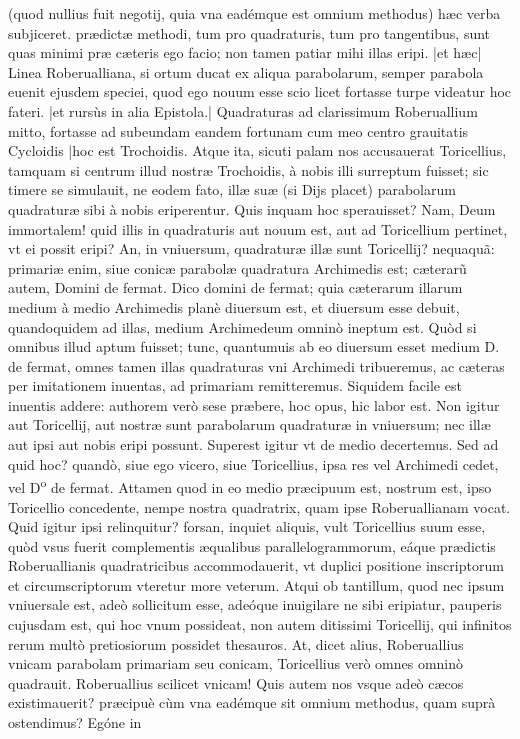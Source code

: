 \documentclass[11pt,a4paper]{article}
\begin{document}
(quod nullius fuit negotij, quia vna eadémque est omnium methodus) hæc verba subjiceret. prædictæ methodi, tum pro quadraturis, tum pro tangentibus, sunt quas minimi præ cæteris ego facio; non tamen patiar mihi illas eripi. |et hæc| Linea Roberualliana, si ortum ducat ex aliqua parabolarum, semper parabola euenit ejusdem speciei, quod ego nouum esse scio licet fortasse turpe videatur hoc fateri. |et rursùs in alia Epistola.| Quadraturas ad clarissimum Roberuallium mitto, fortasse ad subeundam eandem fortunam cum meo centro grauitatis Cycloidis |hoc est Trochoidis. Atque ita, sicuti palam nos accusauerat Toricellius, tamquam si centrum illud nostræ Trochoidis, à nobis illi surreptum fuisset; sic timere se simulauit, ne eodem fato, illæ suæ (si Dijs placet) parabolarum quadraturæ sibi à nobis eriperentur. Quis inquam hoc sperauisset? Nam, Deum immortalem! quid illis in quadraturis aut nouum est, aut ad Toricellium pertinet, vt ei possit eripi? An, in vniuersum, quadraturæ illæ sunt Toricellij? nequaquã: primariæ enim, siue conicæ parabolæ quadratura Archimedis est; cæterarũ autem, Domini de fermat. Dico domini de fermat; quia cæterarum illarum medium à medio Archimedis planè diuersum est, et diuersum esse debuit, quandoquidem ad illas, medium Archimedeum omninò ineptum est. Quòd si omnibus illud aptum fuisset; tunc, quantumuis ab eo diuersum esset medium D. de fermat, omnes tamen illas quadraturas vni Archimedi tribueremus, ac cæteras per imitationem inuentas, ad primariam remitteremus. Siquidem facile est inuentis addere: authorem verò sese præbere, hoc opus, hic labor est. Non igitur aut Toricellij, aut nostræ sunt parabolarum quadraturæ in vniuersum; nec illæ aut ipsi aut nobis eripi possunt. Superest igitur vt de medio decertemus. Sed ad quid hoc? quandò, siue ego vicero, siue Toricellius, ipsa res vel Archimedi cedet, vel D\textsuperscript{o} de fermat. Attamen quod in eo medio præcipuum est, nostrum est, ipso Toricellio concedente, nempe nostra quadratrix, quam ipse Roberuallianam vocat. Quid igitur ipsi relinquitur? forsan, inquiet aliquis, vult Toricellius suum esse, quòd vsus fuerit complementis æqualibus parallelogrammorum, eáque prædictis Roberuallianis quadratricibus accommodauerit, vt duplici positione inscriptorum et circumscriptorum vteretur more veterum. Atqui ob tantillum, quod nec ipsum vniuersale est, adeò sollicitum esse, adeóque inuigilare ne sibi eripiatur, pauperis cujusdam est, qui hoc vnum possideat, non autem ditissimi Toricellij, qui infinitos rerum multò pretiosiorum possidet thesauros. At, dicet alius, Roberuallius vnicam parabolam primariam seu conicam, Toricellius verò omnes omninò quadrauit. Roberuallius scilicet vnicam! Quis autem nos vsque adeò cæcos existimauerit? præcipuè cùm vna eadémque sit omnium methodus, quam suprà ostendimus? Egóne in
\end{document}
